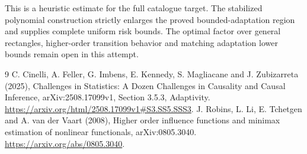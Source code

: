 \documentclass[11pt]{article}
\theoremstyle{remark}
\begin{document}
This is a heuristic estimate for the full catalogue target. The stabilized
polynomial construction strictly enlarges the proved bounded-adaptation
region and supplies complete uniform risk bounds. The optimal factor over
general rectangles, higher-order transition behavior and matching
adaptation lower bounds remain open in this attempt.

\begin{thebibliography}{9}
 C. Cinelli, A. Feller, G. Imbens, E. Kennedy,
S. Magliacane and J. Zubizarreta (2025), Challenges in Statistics:
A Dozen Challenges in Causality and Causal Inference,
arXiv:2508.17099v1, Section 3.5.3, Adaptivity.
\url{https://arxiv.org/html/2508.17099v1#S3.SS5.SSS3}.
 J. Robins, L. Li, E. Tchetgen and A. van der Vaart (2008),
Higher order influence functions and minimax estimation of nonlinear
functionals, arXiv:0805.3040. \url{https://arxiv.org/abs/0805.3040}.
\end{thebibliography}
\end{document}
